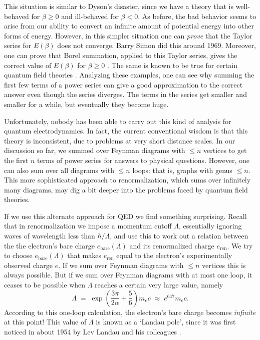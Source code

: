 \documentclass{article}
\newcommand{\bare}{\mathrm{bare}}
\newcommand{\ren}{\mathrm{ren}}
\begin{document}
This situation is similar to Dyson's disaster, since we have a theory that is well-behaved for $\beta \ge 0$ and ill-behaved for $\beta < 0$.  As before, the bad behavior seems to arise from our ability to convert an infinite amount of potential energy into other forms of energy.    However, in this simpler situation one can \emph{prove} that the Taylor series for $E(\beta)$ does not converge.  Barry Simon \cite{Simon1970} did this around 1969.  Moreover, one can prove that Borel summation, applied to this Taylor series, gives the correct value of $E(\beta)$ for $\beta \ge 0$ \cite{GGS}.  The same is known to be true for certain quantum field theories \cite{Rivasseau}.  Analyzing these examples, one can see why summing the first few terms of a power series can give a good approximation to the correct answer even though the series diverges.   The terms in the series get smaller and smaller for a while, but eventually they become huge.

Unfortunately, nobody has been able to carry out this kind of analysis for quantum electrodynamics.  In fact, the current conventional wisdom is that this theory is inconsistent, due to problems at very short distance scales.   In our discussion so far, we summed over Feynman diagrams with $\le n$ vertices to get the first $n$ terms of power series for answers to physical questions.  However, one can also sum over all diagrams with $\le n$ loops: that is, graphs with genus $\le n$.  This more sophisticated approach to renormalization, which sums over infinitely many diagrams, may dig a bit deeper into the problems faced by quantum field theories.   

If we use this alternate approach for QED we find something surprising.  Recall that
in renormalization we impose a momentum cutoff $\Lambda$, essentially ignoring waves of wavelength less than $\hbar/\Lambda$, and use this to work out a relation between the
the electron's bare charge $e_\bare(\Lambda)$ and its renormalized charge $e_\ren$.
We try to choose $e_\bare(\Lambda)$ that makes $e_\ren$ equal to the electron's experimentally observed charge $e$.   If we sum over Feynman diagrams with $\le n$ vertices this is always possible.  But if we sum over Feynman diagrams with at most one loop, it ceases to be possible when $\Lambda$ reaches a certain very large value, namely
\[     \Lambda \; = \; \exp\left(\frac{3 \pi}{2 \alpha} + \frac{5}{6}\right) m_e c \; \approx \; e^{647} m_e c. \] 
According to this one-loop calculation, the electron's bare charge becomes \emph{infinite} at this point!    This value of $\Lambda$ is known as a `Landau pole', since it was first noticed in about 1954 by Lev Landau and his colleagues \cite{Landau}.  
\end{document}
